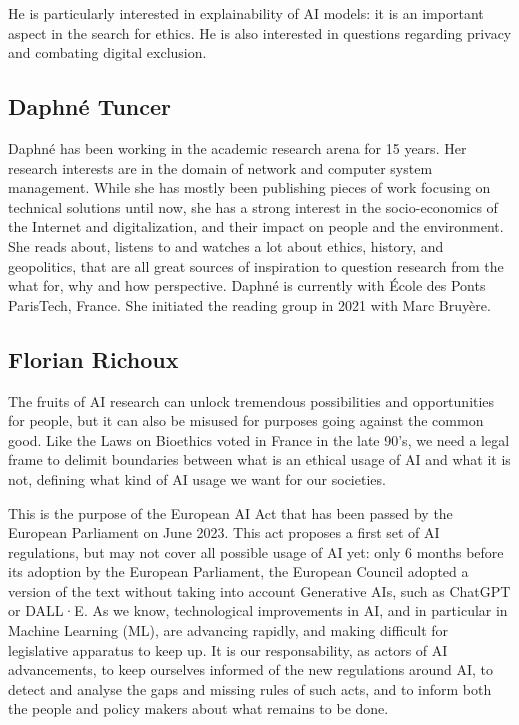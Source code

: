 \documentclass[conference]{IEEEtran}
\begin{document}
He is particularly interested in explainability of AI models: it is an
important aspect  in the search for  ethics. He is also  interested in
questions regarding privacy and combating digital exclusion.

\subsection{Daphné Tuncer}

Daphné  has  been  working  in  the academic  research  arena  for  15
years.  Her  research interests  are  in  the  domain of  network  and
computer  system  management. While  she  has  mostly been  publishing
pieces of  work focusing on technical  solutions until now, she  has a
strong   interest  in   the  socio-economics   of  the   Internet  and
digitalization, and  their impact on  people and the  environment. She
reads about, listens  to and watches a lot about  ethics, history, and
geopolitics, that  are all  great sources  of inspiration  to question
research  from  the what  for,  why  and  how perspective.  Daphné  is
currently with  École des Ponts  ParisTech, France. She  initiated the
reading group in 2021 with Marc Bruyère.

\subsection{Florian Richoux}

The  fruits of  AI research  can unlock  tremendous possibilities  and
opportunities  for people,  but it  can also  be misused  for purposes
going against  the common good.  Like the  Laws on Bioethics  voted in
France in the  late 90’s, we need a legal  frame to delimit boundaries
between what is  an ethical usage of  AI and what it  is not, defining
what kind of AI usage we want for our societies.

This is the purpose of the European AI Act that has been passed by the
European Parliament on June 2023. This  act proposes a first set of AI
regulations, but  may not cover all  possible usage of AI  yet: only 6
months before  its adoption by  the European Parliament,  the European
Council  adopted a  version of  the text  without taking  into account
Generative AIs, such  as ChatGPT or DALL·E. As  we know, technological
improvements in  AI, and in  particular in Machine Learning  (ML), are
advancing rapidly,  and making difficult for  legislative apparatus to
keep up.  It is our responsability,  as actors of AI  advancements, to
keep ourselves  informed of the  new regulations around AI,  to detect
and analyse  the gaps and  missing rules of  such acts, and  to inform
both the people and policy makers about what remains to be done.
\end{document}
